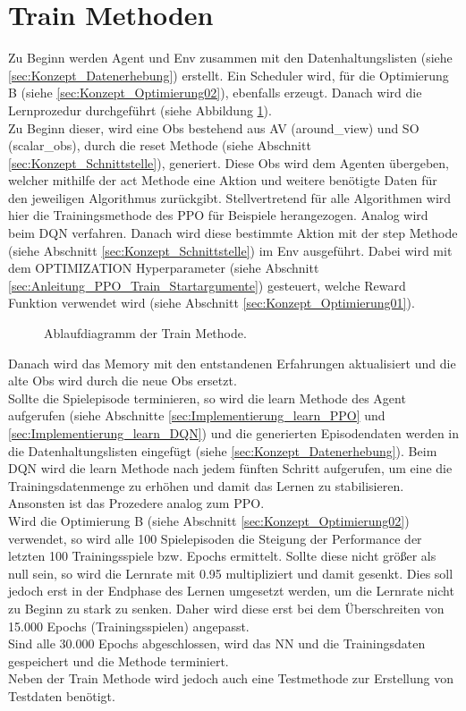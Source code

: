 \section{Train Methoden} \label{sec:Implementierung_train_Methode}
Zu Beginn werden Agent und Env zusammen mit den Datenhaltungslisten (siehe \ref{sec:Konzept_Datenerhebung}) erstellt. Ein Scheduler wird, für die Optimierung B (siehe \ref{sec:Konzept_Optimierung02}), ebenfalls erzeugt. Danach wird die Lernprozedur durchgeführt (siehe Abbildung \ref{fig:Implementierung_Train_Method}).\\
Zu Beginn dieser, wird eine Obs bestehend aus AV (around\_view) und SO (scalar\_obs), durch die reset Methode (siehe Abschnitt \ref{sec:Konzept_Schnittstelle}), generiert. 
Diese Obs wird dem Agenten übergeben, welcher mithilfe der act Methode eine Aktion und weitere benötigte Daten für den jeweiligen Algorithmus zurückgibt.
Stellvertretend für alle Algorithmen wird hier die Trainingsmethode des PPO für Beispiele herangezogen. Analog wird beim DQN verfahren.
Danach wird diese bestimmte Aktion mit der step Methode (siehe Abschnitt \ref{sec:Konzept_Schnittstelle}) im Env ausgeführt. Dabei wird mit dem OPTIMIZATION Hyperparameter (siehe Abschnitt \ref{sec:Anleitung_PPO_Train_Startargumente}) gesteuert, welche Reward Funktion verwendet wird 
(siehe Abschnitt \ref{sec:Konzept_Optimierung01}).
\begin{figure}[H]
	\centering
	\def\svgscale{0.105}
	
	\caption[Ablaufdiagramm der Train Methode]{Ablaufdiagramm der Train Methode.}
	\label{fig:Implementierung_Train_Method}
\end{figure}
Danach wird das Memory mit den entstandenen Erfahrungen aktualisiert und die alte Obs wird durch die neue Obs ersetzt.\\
Sollte die Spielepisode terminieren, so wird die learn Methode des Agent aufgerufen (siehe Abschnitte \ref{sec:Implementierung_learn_PPO} und \ref{sec:Implementierung_learn_DQN}) und die generierten Episodendaten werden in die Datenhaltungslisten eingefügt (siehe \ref{sec:Konzept_Datenerhebung}). 
Beim DQN wird die learn Methode nach jedem fünften Schritt aufgerufen, um eine die Trainingsdatenmenge zu erhöhen und damit das Lernen zu stabilisieren. Ansonsten ist das Prozedere analog zum PPO.\\
Wird die Optimierung B (siehe Abschnitt \ref{sec:Konzept_Optimierung02}) verwendet, so wird alle 100 Spielepisoden die Steigung der Performance der letzten 100 Trainingsspiele bzw. Epochs ermittelt. Sollte diese nicht größer als null sein, so wird die Lernrate mit 0.95 multipliziert und damit gesenkt. Dies soll jedoch erst in der Endphase des Lernen umgesetzt werden, um die Lernrate nicht zu Beginn zu stark zu senken. Daher wird diese erst bei dem Überschreiten von 15.000 Epochs (Trainingsspielen) angepasst.\\
Sind alle 30.000 Epochs abgeschlossen, wird das NN und die Trainingsdaten gespeichert und die Methode terminiert.\\
Neben der Train Methode wird jedoch auch eine Testmethode zur Erstellung von Testdaten benötigt.

